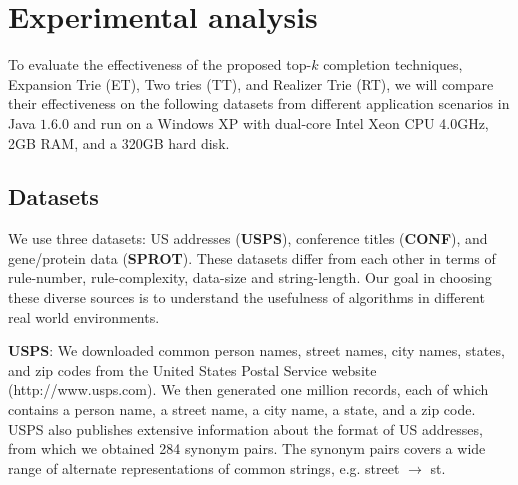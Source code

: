 \documentclass{sig-alternate}
\begin{document}



\section{Experimental analysis}

To evaluate the effectiveness of the proposed top-$k$ completion
techniques, Expansion Trie (ET), Two tries (TT), and  Realizer Trie (RT), we will compare
their effectiveness on the following datasets from different
application scenarios in Java $1.6.0$ and run on a
Windows XP with dual-core Intel Xeon CPU 4.0GHz, 2GB RAM, and a 320GB hard disk.


\subsection{Datasets}
We use three datasets: US addresses (\textbf{USPS}),
conference titles  (\textbf{CONF}), and gene/protein data
(\textbf{SPROT}). These datasets differ from each other in terms of rule-number, rule-complexity, data-size and string-length. Our goal in choosing these diverse sources is to understand the usefulness of algorithms in different real world environments.

\smallskip
\noindent \textbf{{USPS}}: We downloaded common person names, street names,
city names, states, and zip codes from the United States Postal
Service website ({\footnotesize http://www.usps.com}). We then generated
one million records, each of which contains a person name, a street
name, a city name, a state, and a zip code. USPS also publishes
extensive information about the format of US addresses, from which we
obtained 284 synonym pairs. The synonym pairs covers a wide range of alternate
representations of common strings, e.g. street $\rightarrow$ st.
\end{document}
